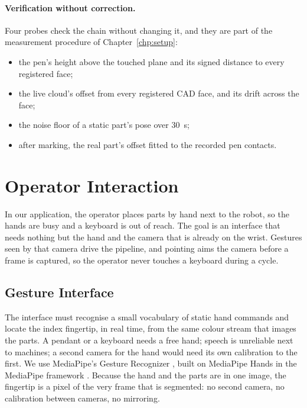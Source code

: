 \paragraph{Verification without correction.} Four probes check the chain without changing it,
and they are part of the measurement procedure of Chapter~\ref{chp:setup}:
\begin{itemize}
\item the pen's height above the touched plane and its signed distance to every registered face;
\item the live cloud's offset from every registered CAD face, and its drift across the face;
\item the noise floor of a static part's pose over 30~s;
\item after marking, the real part's offset fitted to the recorded pen contacts.
\end{itemize}

\section{Operator Interaction}
\label{sec:mc_hri}
In our application, the operator places parts by hand next to the robot, so the hands are busy
and a keyboard is out of reach. The goal is an interface that needs nothing but the hand and the
camera that is already on the wrist. Gestures seen by that camera drive the pipeline, and
pointing aims the camera before a frame is captured, so the operator never touches a keyboard
during a cycle.

\subsection{Gesture Interface}
\label{sec:mc_gestures}
The interface must recognise a small vocabulary of static hand commands and locate the index
fingertip, in real time, from the same colour stream that images the parts. A pendant or a
keyboard needs a free hand; speech is unreliable next to machines; a second camera for the hand
would need its own calibration to the first. We use MediaPipe's Gesture Recognizer
\cite{mediapipe_gesture_recognizer}, built on MediaPipe Hands \cite{zhang2020mediapipehands} in
the MediaPipe framework \cite{lugaresi2019mediapipe}. Because the hand and the parts are in one
image, the fingertip is a pixel of the very frame that is segmented: no second camera, no
calibration between cameras, no mirroring.

